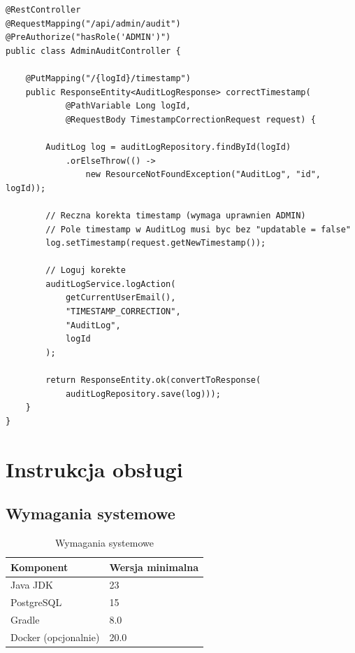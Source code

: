 \documentclass[12pt,a4paper]{report}
\begin{document}
\begin{lstlisting}[style=javastyle, caption={Ręczna korekta timestamp (Admin)}]
@RestController
@RequestMapping("/api/admin/audit")
@PreAuthorize("hasRole('ADMIN')")
public class AdminAuditController {

    @PutMapping("/{logId}/timestamp")
    public ResponseEntity<AuditLogResponse> correctTimestamp(
            @PathVariable Long logId,
            @RequestBody TimestampCorrectionRequest request) {
        
        AuditLog log = auditLogRepository.findById(logId)
            .orElseThrow(() -> 
                new ResourceNotFoundException("AuditLog", "id", logId));
        
        // Reczna korekta timestamp (wymaga uprawnien ADMIN)
        // Pole timestamp w AuditLog musi byc bez "updatable = false"
        log.setTimestamp(request.getNewTimestamp());
        
        // Loguj korekte
        auditLogService.logAction(
            getCurrentUserEmail(),
            "TIMESTAMP_CORRECTION",
            "AuditLog",
            logId
        );
        
        return ResponseEntity.ok(convertToResponse(
            auditLogRepository.save(log)));
    }
}
\end{lstlisting}

\chapter{Instrukcja obsługi}

\section{Wymagania systemowe}

\begin{table}[H]
\centering
\caption{Wymagania systemowe}
\begin{tabular}{|l|l|}
\hline
\textbf{Komponent} & \textbf{Wersja minimalna} \\
\hline
Java JDK & 23 \\
PostgreSQL & 15 \\
Gradle & 8.0 \\
Docker (opcjonalnie) & 20.0 \\
\hline
\end{tabular}
\end{table}
\end{document}

